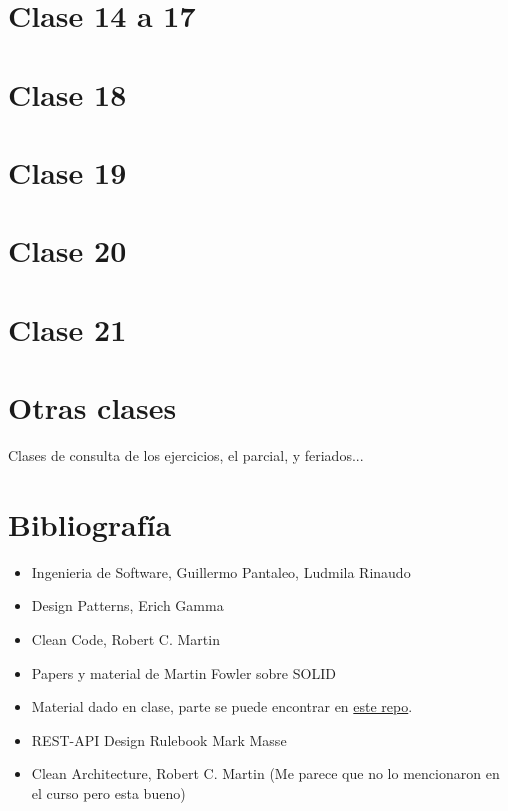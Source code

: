 \documentclass[titlepage,a4paper]{article}
\begin{document}
\section*{Clase 14 a 17}

\newpage


\section*{Clase 18}

\newpage

\section*{Clase 19}

\newpage

\section*{Clase 20}

\newpage


\section*{Clase 21}

\newpage

\section*{Otras clases}
Clases de consulta de los ejercicios, el parcial, y feriados...

\section{Bibliografía}
\begin{itemize}
    \item Ingenieria de Software, Guillermo Pantaleo, Ludmila Rinaudo
    \item Design Patterns, Erich Gamma
    \item Clean Code, Robert C. Martin
    \item Papers y material de Martin Fowler sobre SOLID
    \item Material dado en clase, parte se puede encontrar en  \href{https://github.com/7510-tecnicas-de-disenio/material-clases}{este repo}.
    \item REST-API Design Rulebook Mark Masse
    \item Clean Architecture, Robert C. Martin (Me parece que no lo mencionaron en el curso pero esta bueno)
\end{itemize}
\end{document}
